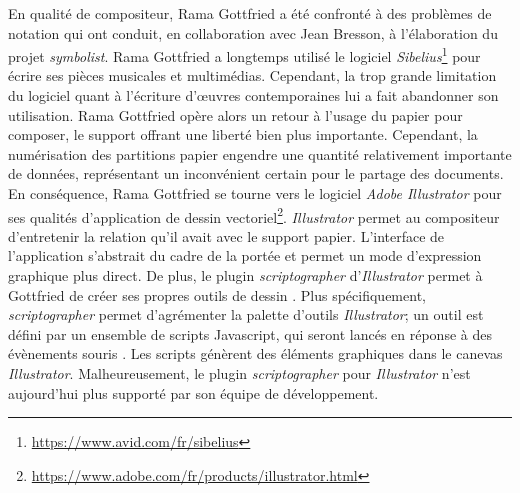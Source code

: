 En qualité de compositeur, Rama Gottfried a été confronté à des problèmes de notation qui ont conduit, en collaboration avec Jean Bresson, à l'élaboration du projet \textit{symbolist}.
Rama Gottfried a longtemps utilisé le logiciel \textit{Sibelius}\footnote{\url{https://www.avid.com/fr/sibelius}} pour écrire ses pièces musicales et multimédias. Cependant, la trop grande limitation du logiciel quant à l'écriture d'œuvres contemporaines lui a fait abandonner son utilisation. 
Rama Gottfried opère alors un retour à l'usage du papier pour composer, le support offrant une liberté bien plus importante. Cependant, la numérisation des partitions \og papier \fg engendre une quantité relativement importante de données, représentant un inconvénient certain pour le partage des documents.
En conséquence, Rama Gottfried se tourne vers le logiciel \textit{Adobe Illustrator} pour ses qualités d'application de dessin vectoriel\footnote{\url{https://www.adobe.com/fr/products/illustrator.html}}. \textit{Illustrator} permet au compositeur d'entretenir la relation qu'il avait avec le support papier. L'interface de l'application s'abstrait du cadre de la portée et permet un mode d'expression graphique plus direct. De plus, le plugin \textit{scriptographer} d'\textit{Illustrator} permet à Gottfried de créer ses propres outils de dessin \cite{scriptographer2018}. Plus spécifiquement, \textit{scriptographer} permet d'agrémenter la palette d'outils \textit{Illustrator}; un outil est défini par un ensemble de scripts Javascript, qui seront lancés en réponse à des évènements \og souris \fg. Les scripts génèrent des éléments graphiques dans le canevas \textit{Illustrator}. Malheureusement, le plugin \textit{scriptographer} pour \textit{Illustrator} n'est aujourd'hui plus supporté par son équipe de développement.

